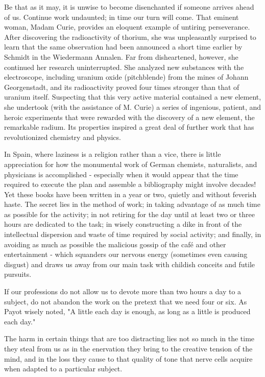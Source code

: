 \documentclass{article}
\begin{document}
Be that as it may, it is unwise to become disenchanted if someone arrives ahead of us. Continue work undaunted; in time our turn will come. That eminent woman, Madam Curie, provides an eloquent example of untiring perseverance. After discovering the radioactivity of thorium, she was unpleasantly surprised to learn that the same observation had been announced a short time earlier by Schmidt in the Wiedermann Annalen. Far from disheartened, however, she continued her research uninterrupted. She analyzed new substances with the electroscope, including uranium oxide (pitchblende) from the mines of Johann Georgenstadt, and its radioactivity proved four times stronger than that of uranium itself. Suspecting that this very active material contained a new element, she undertook (with the assistance of M. Curie) a series of ingenious, patient, and heroic experiments that were rewarded with the discovery of a new element, the remarkable radium. Its properties inspired a great deal of further work that has revolutionized chemistry and physics.

In Spain, where laziness is a religion rather than a vice, there is little appreciation for how the monumental work of German chemists, naturalists, and physicians is accomplished - especially when it would appear that the time required to execute the plan and assemble a bibliography might involve decades! Yet these books have been written in a year or two, quietly and without feverish haste. The secret lies in the method of work; in taking advantage of as much time as possible for the activity; in not retiring for the day until at least two or three hours are dedicated to the task; in wisely constructing a dike in front of the intellectual dispersion and waste of time required by social activity; and finally, in avoiding as much as possible the malicious gossip of the café and other entertainment - which squanders our nervous energy (sometimes even causing disgust) and draws us away from our main task with childish conceits and futile pursuits.

If our professions do not allow us to devote more than two hours a day to a subject, do not abandon the work on the pretext that we need four or six. As Payot wisely noted, "A little each day is enough, as long as a little is produced each day."

The harm in certain things that are too distracting lies not so much in the time they steal from us as in the enervation they bring to the creative tension of the mind, and in the loss they cause to that quality of tone that nerve cells acquire when adapted to a particular subject.
\end{document}
